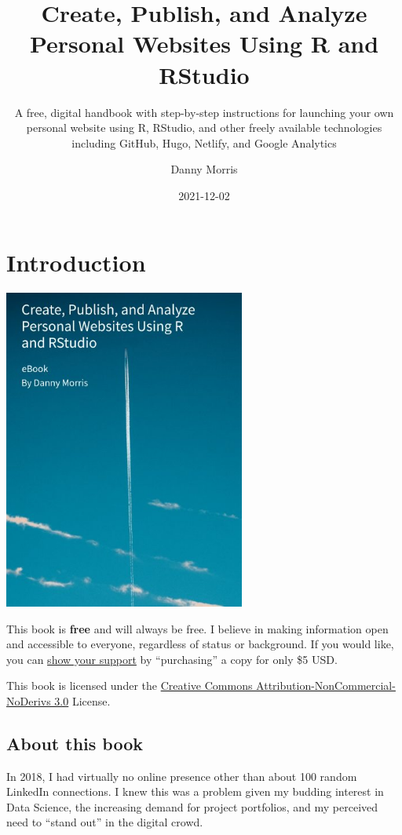 \documentclass[
]{book}
\title{Create, Publish, and Analyze Personal Websites Using R and RStudio}
\subtitle{A free, digital handbook with step-by-step instructions for launching your own personal website using R, RStudio, and other freely available technologies including GitHub, Hugo, Netlify, and Google Analytics}
\author{Danny Morris}
\date{2021-12-02}
\begin{document}
\maketitle

{
\setcounter{tocdepth}{1}
\tableofcontents
}
\hypertarget{introduction}{%
\chapter{Introduction}\label{introduction}}

\includegraphics[width=300px]{image}

This book is \textbf{free} and will always be free. I believe in making information open and accessible to everyone, regardless of status or background. If you would like, you can \href{https://r4sites.com/products/r4sites-book/}{show your support} by ``purchasing'' a copy for only \$5 USD.

This book is licensed under the \href{http://creativecommons.org/licenses/by-nc-nd/3.0/us/}{Creative Commons Attribution-NonCommercial-NoDerivs 3.0} License.

\hypertarget{about-this-book}{%
\section{About this book}\label{about-this-book}}

In 2018, I had virtually no online presence other than about 100 random LinkedIn connections. I knew this was a problem given my budding interest in Data Science, the increasing demand for project portfolios, and my perceived need to ``stand out'' in the digital crowd.
\end{document}
